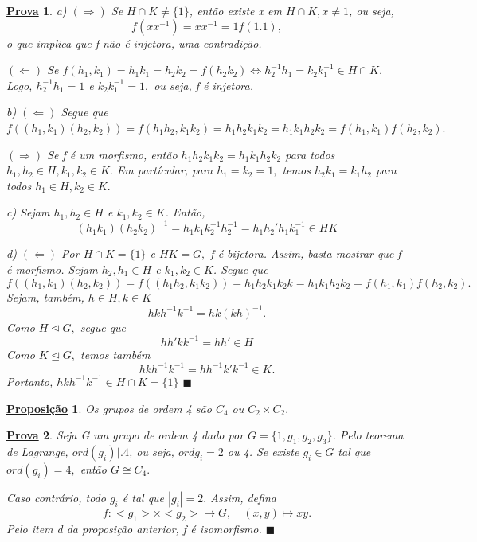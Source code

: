 \documentclass{article}
\newtheorem*{prop*}{\underline{Proposi\c c\~ao}}
\newtheorem*{proof*}{\underline{Prova}}
\renewcommand\qedsymbol{$\blacksquare$}
\begin{document}
\begin{proof*}
  a) $(\Rightarrow)$ Se $H\cap{K}\neq\{1\}$, ent\~ao existe x em $H\cap{K}, x\neq 1$, ou seja, 
    $$
      f(xx^{-1}) = xx^{-1} = 1 f(1.1),
    $$
    o que implica que f n\~ao \'e injetora, uma contradi\c c\~ao.

    $(\Leftarrow)$ Se $f(h_{1},k_{1})=h_{1}k_{1}=h_{2}k_{2} = f(h_{2}k_{2}) \Longleftrightarrow h_{2}^{-1}h_{1} = k_{2}k_{1}^{-1}\in H\cap K$. Logo,
    $h_{2}^{-1}h_{1} = 1$ e $k_{2}k_{1}^{-1} = 1,$ ou seja, f \'e injetora.

  b) $(\Leftarrow)$ Segue que $f((h_{1},k_{1})(h_{2},k_{2})) = f(h_{1}h_{2}, k_{1}k_{2}) = h_{1}h_{2}k_{1}k_{2} = h_{1}k_{1}h_{2}k_{2} =
f(h_{1}, k_{1})f(h_{2},k_{2}).$

    $(\Rightarrow)$ Se f \'e um morfismo, ent\~ao $h_{1}h_{2}k_{1}k_{2} = h_{1}k_{1}h_{2}k_{2}$ para todos $h_{1},h_{2}\in H, k_{1},k_{2}\in K.$
  Em part\'icular, para $h_{1}=k_{2}=1,$ temos $h_{2}k_{1} = k_{1}h_{2}$ para todos $h_{1}\in H, k_{2}\in K.$

  c) Sejam $h_{1}, h_{2}\in H$ e $k_{1}, k_{2}\in K$. Ent\~ao, 
    $$
    (h_{1}k_{1})(h_{2}k_{2})^{-1} = h_{1}k_{1}k_{2}^{-1}h_{2}^{-1} = h_{1}h_{2}'h_{1}k_{1}^{-1}\in HK
    $$

    d) $(\Leftarrow)$ Por $H\cap K = \{1\}$ e $HK = G,$ f \'e bijetora. Assim, basta mostrar que f \'e morfismo. 
    Sejam $h_{2}, h_{1}\in H$ e $k_{1}, k_{2}\in K$. Segue que 
      $$
        f((h_{1},k_{1})(h_{2}, k_{2})) = f((h_{1}h_{2}, k_{1}k_{2})) = h_{1}h_{2}k_{1}k_{2}k = h_{1}k_{1}h_{2}k_{2} = f(h_{1}, k_{1})f(h_{2}, k_{2}).
      $$
      Sejam, tamb\'em, $h\in H, k\in K$ 
        $$
          hkh^{-1}k^{-1} = hk(kh)^{-1}.
        $$
        Como $H\trianglelefteq{G},$ segue que 
          $$
            hh'kk^{-1} = hh'\in H
          $$
        Como $K\trianglelefteq{G},$ temos tamb\'em 
          $$
            hkh^{-1}k^{-1} = hh^{-1}k'k^{-1}\in K.
          $$
          Portanto, $hkh^{-1}k^{-1}\in H\cap K=\{1\}$ \qedsymbol
\end{proof*}
\begin{prop*}
  Os grupos de ordem 4 s\~ao $C_{4}$ ou $C_{2}\times C_{2}.$
\end{prop*}
\begin{proof*}
  Seja G um grupo de ordem 4 dado por $G=\{1, g_{1}, g_{2}, g_{3}\}$. Pelo teorema de Lagrange, $ord(g_{i})\biggl|_{}^{}\biggr.4$,
ou seja, $ord g_{i} = 2$ ou 4. Se existe $g_{i}\in G$ tal que $ord(g_{i}) = 4,$ ent\~ao $G\cong C_{4}.$

Caso contr\'ario, todo $g_{i}$ \'e tal que $|g_{i}|=2.$ Assim, defina 
  $$
    f:<g_{1}>\times<g_{2}>\rightarrow G,\quad (x,y)\mapsto xy.
  $$
  Pelo item d da proposi\c c\~ao anterior, f \'e isomorfismo. \qedsymbol
\end{proof*}
\newpage
\end{document}
